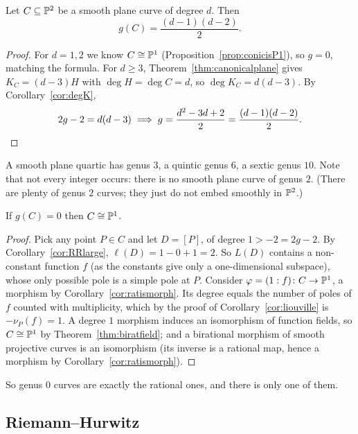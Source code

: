 \documentclass[a4paper]{scrartcl}
\begin{document}
\begin{corollary}\label{cor:genusdegree}
	Let $C \subseteq \mathbb{P}^2$ be a smooth plane curve of degree $d$. Then
	$$g(C) = \frac{(d-1)(d-2)}{2}.$$
\end{corollary}

\begin{proof}
	For $d = 1,2$ we know $C \cong \mathbb{P}^1$ (Proposition~\ref{prop:conicisP1}), so $g = 0$, matching the formula. For $d \geq 3$, Theorem~\ref{thm:canonicalplane} gives $K_C = (d-3)H$ with $\deg H = \deg C = d$, so $\deg K_C = d(d-3)$. By Corollary~\ref{cor:degK},
	$$2g - 2 = d(d-3) \implies g = \frac{d^2-3d+2}{2} = \frac{(d-1)(d-2)}{2}. \qedhere$$
\end{proof}

\begin{example}
	A smooth plane quartic has genus $3$, a quintic genus $6$, a sextic genus $10$. Note that not every integer occurs: there is no smooth plane curve of genus $2$. (There are plenty of genus $2$ curves; they just do not embed smoothly in $\mathbb{P}^2$.)
\end{example}

\begin{corollary}\label{cor:g0}
	If $g(C) = 0$ then $C \cong \mathbb{P}^1$.
\end{corollary}

\begin{proof}
	Pick any point $P \in C$ and let $D = [P]$, of degree $1 > -2 = 2g-2$. By Corollary~\ref{cor:RRlarge}, $\ell(D) = 1 - 0 + 1 = 2$. So $L(D)$ contains a non-constant function $f$ (as the constants give only a one-dimensional subspace), whose only possible pole is a simple pole at $P$. Consider $\varphi = (1:f)\colon C \to \mathbb{P}^1$, a morphism by Corollary~\ref{cor:ratismorph}. Its degree equals the number of poles of $f$ counted with multiplicity, which by the proof of Corollary~\ref{cor:liouville} is $-\nu_P(f) = 1$. A degree $1$ morphism induces an isomorphism of function fields, so $C \cong \mathbb{P}^1$ by Theorem~\ref{thm:biratfield}; and a birational morphism of smooth projective curves is an isomorphism (its inverse is a rational map, hence a morphism by Corollary~\ref{cor:ratismorph}).
\end{proof}

So genus $0$ curves are exactly the rational ones, and there is only one of them.

\subsection{Riemann--Hurwitz}
\end{document}

